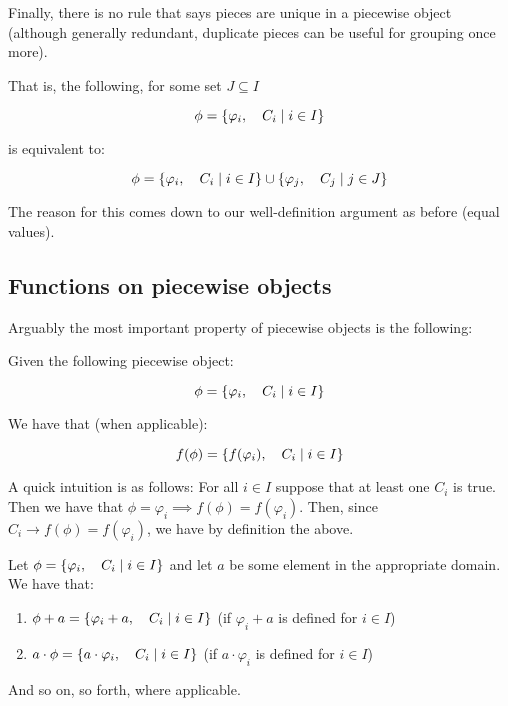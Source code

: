\begin{theorem}
    Finally, there is no rule that says pieces are unique in a piecewise object (although generally redundant, duplicate pieces can be useful for grouping once more).

    That is, the following, for some set $J\subseteq I$

    $$
        \phi=\{\varphi_i,\quad C_i\mid i\in I\}
    $$

    is equivalent to:

    $$
        \phi=\{\varphi_i,\quad C_i\mid i\in I\}\cup\{\varphi_j,\quad C_j\mid j\in J\}
    $$

    The reason for this comes down to our well-definition argument as before (equal values).
\end{theorem}
\subsection{Functions on piecewise objects}
Arguably the most important property of piecewise objects is the following:
\begin{theorem}
    Given the following piecewise object:

    $$
        \phi = \{\varphi_i,\quad C_i\mid i\in I\}
    $$

    We have that (when applicable):

    $$
        f(\phi) = \{f(\varphi_i),\quad C_i\mid i\in I\}
    $$

    A quick intuition is as follows: For all $i\in I$ suppose that at least one $C_i$ is true. Then we have that $\phi=\varphi_i\implies f(\phi)=f(\varphi_i)$. Then, since $C_i\rightarrow f(\phi)=f(\varphi_i)$, we have by definition the above.
\end{theorem}

\begin{theorem}
    Let $\phi=\{\varphi_i,\quad C_i\mid i\in I\}$ and let $a$ be some element in the appropriate domain. We have that:

    \begin{enumerate}
        \item $\phi+a=\{\varphi_i+a,\quad C_i\mid i\in I\}$ (if $\varphi_i+a$ is defined for $i\in I$)
        \item $a\cdot\phi=\{a\cdot\varphi_i,\quad C_i\mid i\in I\}$ (if $a\cdot\varphi_i$ is defined for $i\in I$)
    \end{enumerate}

    And so on, so forth, where applicable.
\end{theorem}

